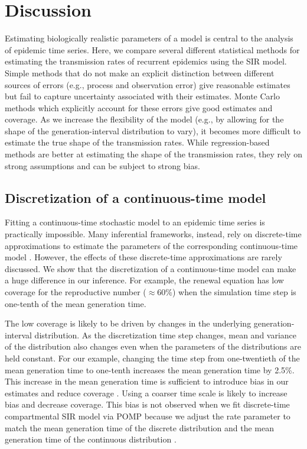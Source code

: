 \documentclass{article}
\begin{document}
\section{Discussion}

Estimating biologically realistic parameters of a model is central to the analysis of epidemic time series.
Here, we compare several different statistical methods for estimating the transmission rates of recurrent epidemics using the SIR model.
Simple methods that do not make an explicit distinction between different sources of errors (e.g., process and observation error) give reasonable estimates but fail to capture uncertainty associated with their estimates.
Monte Carlo methods which explicitly account for these errors give good estimates and coverage.
As we increase the flexibility of the model (e.g., by allowing for the shape of the generation-interval distribution to vary), it becomes more difficult to estimate the true shape of the transmission rates.
While regression-based methods are better at estimating the shape of the transmission rates, they rely on strong assumptions and can be subject to strong bias.

\subsection{Discretization of a continuous-time model}

Fitting a continuous-time stochastic model to an epidemic time series is practically impossible.
Many inferential frameworks, instead, rely on discrete-time approximations to estimate the parameters of the corresponding continuous-time model \citep{finkenstadt2002stochastic, king2015statistical, champredon2018two, li2018fitting}.
However, the effects of these discrete-time approximations are rarely discussed.
We show that the discretization of a continuous-time model can make a huge difference in our inference.
For example, the renewal equation has low coverage for the reproductive number ($\approx 60\%$) when the simulation time step is one-tenth of the mean generation time.

The low coverage is likely to be driven by changes in the underlying generation-interval distribution.
As the discretization time step changes, mean and variance of the distribution also changes even when the parameters of the distributions are held constant.
For our example, changing the time step from one-twentieth of the mean generation time to one-tenth increases the mean generation time by 2.5\%.
This increase in the mean generation time is sufficient to introduce bias in our estimates and reduce coverage \citep{wallinga2006generation}.
Using a coarser time scale is likely to increase bias and decrease coverage.
This bias is not observed when we fit discrete-time compartmental SIR model via POMP because we adjust the rate parameter to match the mean generation time of the discrete distribution and the mean generation time of the continuous distribution \citep{he2009plug}.
\end{document}

